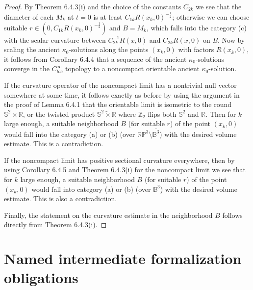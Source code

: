\begin{proof}
By Theorem 6.4.3(i) and the choice of the constants $C_{2k}$ we
see that the diameter of each $M_k$ at $t=0$ is at least
$C_{1k}R(x_k,0)^{-\frac{1}{2}}$; otherwise we can choose suitable
$r \in (0,C_{1k}R(x_k,0)^{-\frac{1}{2}})$ and $B=M_k$, which falls
into the category (c) with the scalar curvature between
$C_{2k}^{-1}R(x,0)$ and $C_{2k}R(x,0)$ on $B$. Now by scaling the
ancient $\kappa_0$-solutions along the points $(x_k,0)$ with
factors $R(x_k,0)$, it follows from Corollary 6.4.4 that a
sequence of the ancient $\kappa_0$-solutions converge in the
$C^{\infty}_{loc}$ topology to a noncompact orientable ancient
$\kappa_0$-solution.

If the curvature operator of the noncompact limit has a nontrivial
null vector somewhere at some time, it follows exactly as before
by using the argument in the proof of Lemma 6.4.1 that the
orientable limit is isometric to the round $\mathbb{S}^2 \times
\mathbb{R}$, or the twisted product $\mathbb{S}^2 \tilde{\times}
\mathbb{R}$ where $\mathbb{Z}_2$ flips both $\mathbb{S}^2$ and
$\mathbb{R}$. Then for $k$ large enough, a suitable neighborhood
$B$ (for suitable $r$) of the point $(x_k,0)$ would fall into the
category (a) or (b) (over
$\mathbb{R}\mathbb{P}^3\setminus\bar{\mathbb{B}^3}$) with the
desired volume estimate. This is a contradiction.

If the noncompact limit has positive sectional curvature
everywhere, then by using Corollary 6.4.5 and Theorem 6.4.3(i) for
the noncompact limit we see that for $k$ large enough, a suitable
neighborhood $B$ (for suitable $r$) of the point $(x_k,0)$ would
fall into category (a) or (b) (over $\mathbb{B}^3$) with the
desired volume estimate. This is also a contradiction.

Finally, the statement on the curvature estimate in the
neighborhood $B$ follows directly from Theorem 6.4.3(i).
\end{proof}


\newpage

\section{Named intermediate formalization obligations}

